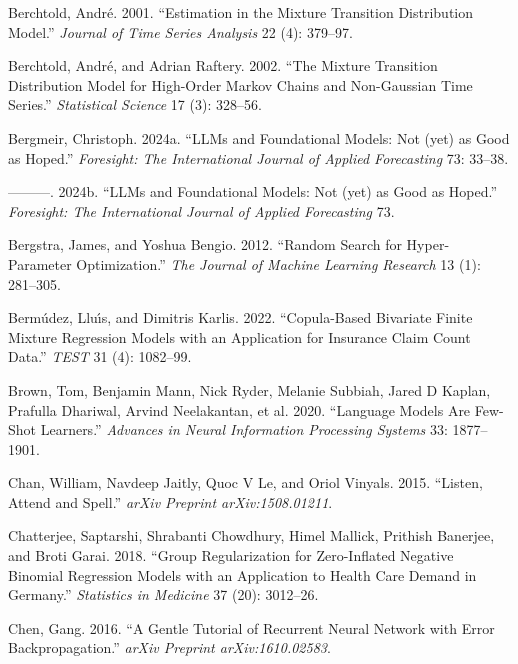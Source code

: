 \documentclass[
  letterpaper,
  double,
  12pt,
  1.0in]{beavtex}
\newlength{\cslhangindent}
\newenvironment{CSLReferences}[2] %
 {\begin{list}{}{%
  \setlength{\itemindent}{0pt}
  \setlength{\leftmargin}{0pt}
  \setlength{\parsep}{0pt}
  \ifodd #1
   \setlength{\leftmargin}{\cslhangindent}
   \setlength{\itemindent}{-1\cslhangindent}
  \fi
  \setlength{\itemsep}{#2\baselineskip}}}
 {\end{list}}
\begin{document}
\begin{CSLReferences}{1}{0}
Berchtold, André. 2001. {``Estimation in the Mixture Transition
Distribution Model.''} \emph{Journal of Time Series Analysis} 22 (4):
379--97.

Berchtold, André, and Adrian Raftery. 2002. {``The Mixture Transition
Distribution Model for High-Order Markov Chains and Non-Gaussian Time
Series.''} \emph{Statistical Science} 17 (3): 328--56.

Bergmeir, Christoph. 2024a. {``LLMs and Foundational Models: Not (yet)
as Good as Hoped.''} \emph{Foresight: The International Journal of
Applied Forecasting} 73: 33--38.

---------. 2024b. {``LLMs and Foundational Models: Not (yet) as Good as
Hoped.''} \emph{Foresight: The International Journal of Applied
Forecasting} 73.

Bergstra, James, and Yoshua Bengio. 2012. {``Random Search for
Hyper-Parameter Optimization.''} \emph{The Journal of Machine Learning
Research} 13 (1): 281--305.

Bermúdez, Lluı́s, and Dimitris Karlis. 2022. {``Copula-Based Bivariate
Finite Mixture Regression Models with an Application for Insurance Claim
Count Data.''} \emph{TEST} 31 (4): 1082--99.

Brown, Tom, Benjamin Mann, Nick Ryder, Melanie Subbiah, Jared D Kaplan,
Prafulla Dhariwal, Arvind Neelakantan, et al. 2020. {``Language Models
Are Few-Shot Learners.''} \emph{Advances in Neural Information
Processing Systems} 33: 1877--1901.

Chan, William, Navdeep Jaitly, Quoc V Le, and Oriol Vinyals. 2015.
{``Listen, Attend and Spell.''} \emph{arXiv Preprint arXiv:1508.01211}.

Chatterjee, Saptarshi, Shrabanti Chowdhury, Himel Mallick, Prithish
Banerjee, and Broti Garai. 2018. {``Group Regularization for
Zero-Inflated Negative Binomial Regression Models with an Application to
Health Care Demand in Germany.''} \emph{Statistics in Medicine} 37 (20):
3012--26.

Chen, Gang. 2016. {``A Gentle Tutorial of Recurrent Neural Network with
Error Backpropagation.''} \emph{arXiv Preprint arXiv:1610.02583}.


\end{CSLReferences}
\end{document}
